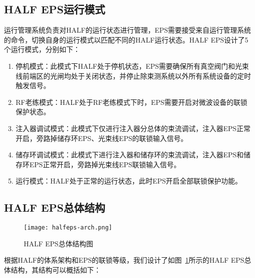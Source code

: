 \subsection{HALF EPS运行模式}

运行管理系统负责对HALF的运行状态进行管理，EPS需要接受来自运行管理系统的命令，切换自身的运行模式以匹配不同的HALF运行状态。HALF EPS设计了5个运行模式，分别如下：

\begin{enumerate}
  \item 停机模式：此模式下HALF处于停机状态，EPS需要确保所有真空阀门和光束线前端区的光闸均处于关闭状态，并停止除束测系统以外所有系统设备的定时触发信号。

  \item RF老练模式：HALF处于RF老练模式下时，EPS需要开启对微波设备的联锁保护状态。

  \item 注入器调试模式：此模式下仅进行注入器分总体的束流调试，注入器EPS正常开启，旁路掉储存环EPS、光束线EPS的联锁输入信号。

  \item 储存环调试模式：此模式下进行注入器和储存环的束流调试，注入器EPS和储存环EPS正常开启，旁路掉光束线EPS联锁输入信号。

  \item 运行模式：HALF处于正常的运行状态，此时EPS开启全部联锁保护功能。

\end{enumerate}


\subsection{HALF EPS总体结构}

\begin{figure}[!htb]
	\centering
	\texttt{[image: halfeps-arch.png]}
	\caption{HALF EPS总体结构图}
	\label{fig:halfeps-arch}
\end{figure}

根据HALF的体系架构和EPS的联锁等级，我们设计了如图~\ref{fig:halfeps-arch}所示的HALF EPS总体结构，其结构可以概括如下：

